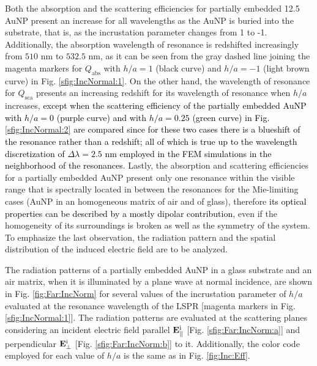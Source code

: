 Both the absorption and the scattering efficiencies for partially embedded 12.5 AuNP present an increase  for all wavelengths as the AuNP is buried into the substrate, that is, as the incrustation parameter changes from 1 to -1. Additionally, the  absorption wavelength of resonance is redshifted  increasingly from $510$ nm to $532.5$ nm, as it can be seen from the gray dashed line joining the magenta markers for  $Q_\text{abs}$  with $h/a = 1$ (black curve) and $h/a = -1$ (light brown curve) in Fig. \ref{sfig:IncNormal:1}. On the other hand, the wavelength of resonance for $Q_\text{sca}$ presents an increasing redshift for its wavelength of resonance when $h/a$ increases, \textcolor{black}{except when the scattering efficiency of the partially embedded AuNP with $h/a = 0$ (purple curve) and with $h/a = 0.25$ (green curve) in Fig. \ref{sfig:IncNormal:2} are compared since for these two cases there is a blueshift of the resonance rather than a redshift; all of which is true up to the wavelength discretization of $\Delta\lambda = 2.5$ nm employed in the FEM simulations in the neighborhood of the resonances}. Lastly, the absorption and scattering efficiencies for a partially embedded AuNP present only one resonance within the visible range that is spectrally located in between the resonances for the Mie-limiting cases (AuNP in an homogeneous matrix of air and of glass), therefore \textcolor{black}{its optical properties can be described by a mostly dipolar contribution}, even if the homogeneity of its surroundings is broken as well as the symmetry of the system. To emphasize the last observation, the radiation pattern and the spatial distribution of the induced electric field are to be analyzed.

The radiation patterns of a partially embedded AuNP in a glass substrate and an air matrix, when it is illuminated by a plane wave  at normal incidence, are shown in Fig. \ref{fig:Far:IncNorm} for several values of the incrustation parameter of $h/a$ evaluated at the resonance wavelength of the LSPR [magenta markers in Fig. \ref{sfig:IncNormal:1}]. The  radiation patterns are evaluated at the scattering planes considering an incident electric field parallel  $\vb{E}^\text{i}_\parallel$ [Fig. \ref{sfig:Far:IncNorm:a}] and  perpendicular  $\vb{E}^\text{i}_\perp$ [Fig. \ref{sfig:Far:IncNorm:b}] to it. Additionally, the color code employed for each value of $h/a$ is the same as in Fig. \ref{fig:Inc:Eff}.

